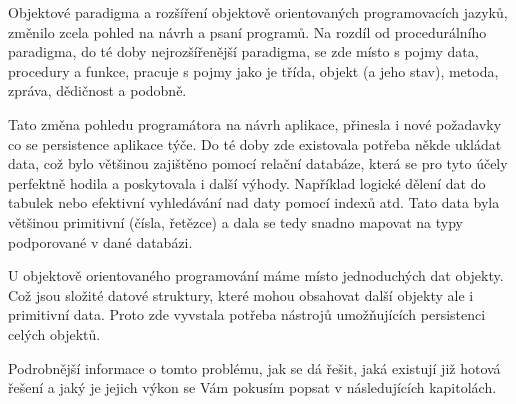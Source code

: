 Objektové paradigma a rozšíření objektově orientovaných programovacích jazyků, změnilo zcela pohled na návrh a psaní programů. Na rozdíl od procedurálního paradigma, do té doby nejrozšířenější paradigma, se zde místo s pojmy data, procedury a funkce, pracuje s pojmy jako je třída, objekt (a jeho stav), metoda, zpráva, dědičnost a podobně.

Tato změna pohledu programátora na návrh aplikace, přinesla i nové požadavky co se persistence aplikace týče. Do té doby zde existovala potřeba někde ukládat data, což bylo většinou zajištěno pomocí relační databáze, která se pro tyto účely perfektně hodila a poskytovala i další výhody. Například logické dělení dat do tabulek nebo efektivní vyhledávání nad daty pomocí indexů atd. Tato data byla většinou primitivní (čísla, řetězce) a dala se tedy snadno mapovat na typy podporované v dané databázi.

U objektově orientovaného programování máme místo jednoduchých dat objekty. Což jsou složité datové struktury, které mohou obsahovat další objekty ale i primitivní data. Proto zde vyvstala potřeba nástrojů umožňujících persistenci celých objektů.

Podrobnější informace o tomto problému, jak se dá řešit, jaká existují již hotová řešení a jaký je jejich výkon se Vám pokusím popsat v následujících kapitolách.
